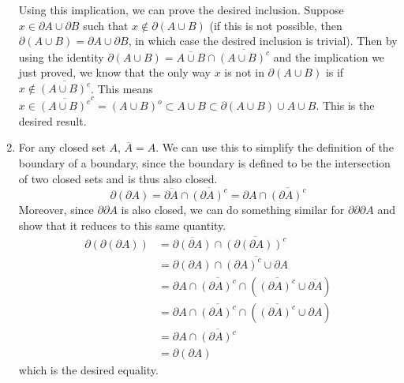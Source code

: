 \documentclass[10pt]{amsart}
\theoremstyle{plain}
\theoremstyle{definition}
\newcommand{\p}{\partial}
\begin{document}
\begin{enumerate}
		Using this implication, we can prove the desired inclusion. Suppose $x \in \p A \cup \p B$ such that $x \not\in \p(A \cup B)$ (if this is not possible, then $\p(A \cup B) = \p A \cup \p B$, in which case the desired inclusion is trivial). Then by using the identity $\p(A \cup B) = \overline{A \cup B} \cap \overline{(A \cup B)^c}$ and the implication we just proved, we know that the only way $x$ is not in $\p(A \cup B)$ is if $x \not\in \overline{(A \cup B)^c}$. This means  $x \in \overline{(A \cup B)^c}^c = (A \cup B)^o \subset A \cup B \subset \p(A \cup B) \cup A \cup B$. This is the desired result.
	\item 
		For any closed set $A$, $\overline{A}=A$. We can use this to simplify the definition of the boundary of a boundary, since the boundary is defined to be the intersection of two closed sets and is thus also closed.
		\[
			\p(\p A) = \overline{\p A} \cap \overline{(\p A)^c} = \p A \cap \overline{(\p A)^c} 
		\] 
		Moreover, since $\p\p A$ is also closed, we can do something similar for $\p\p\p A$ and show that it reduces to this same quantity.
		\begin{align*}
			\p(\p(\p A)) &= \overline{\p(\p A)} \cap \overline{(\p(\p A))^c} \\
				     &= \p(\p A) \cap \overline{(\p A)^c \cup \p A} \\
				     &= \p A \cap \overline{(\p A)^c} \cap \left( \overline{(\p A)^c} \cup \overline{\p A} \right) \\
				     &= \p A \cap \overline{(\p A)^c} \cap \left( \overline{(\p A)^c} \cup \p A \right) \\
				     &= \p A \cap \overline{(\p A)^c} \\
				     &= \p (\p A)
		\end{align*}
		which is the desired equality.

\end{enumerate}
\end{document}
